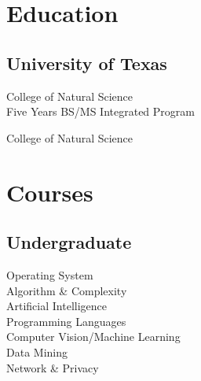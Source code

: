 \documentclass[]{deedy-resume-openfont}
\begin{document}
%
%

%
%



%
%

\begin{minipage}[t]{0.33\textwidth}


\section{Education}

\subsection{University of Texas}

\vspace{\topsep} %

College of Natural Science \\
Five Years BS/MS Integrated Program \\
\sectionsep

College of Natural Science \\
\sectionsep



\section{Courses}

\subsection{Undergraduate}
Operating System \\
Algorithm \& Complexity \\
Artificial Intelligence \\
Programming Languages \\
Computer Vision/Machine Learning \\
Data Mining \\
Network \& Privacy \\


\end{minipage}
\end{document}
